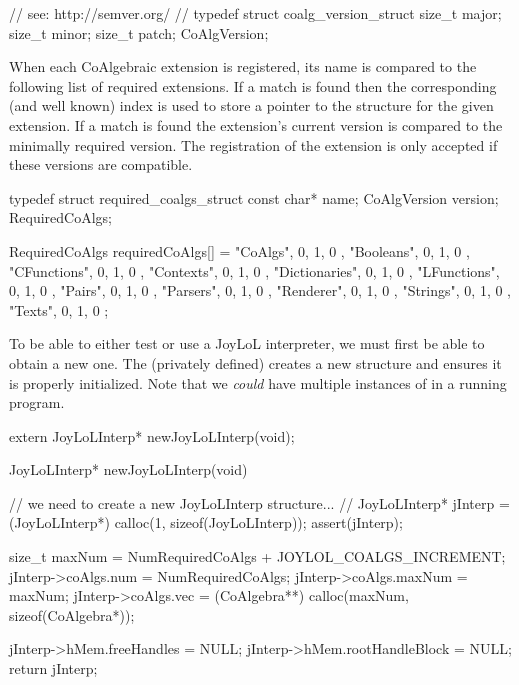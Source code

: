 \startCHeader
// see: http://semver.org/
//
typedef struct coalg_version_struct {
  size_t major;
  size_t minor;
  size_t patch;
} CoAlgVersion;
\stopCHeader

When each CoAlgebraic extension is registered, its name is compared to the 
following list of required extensions. If a match is found then the 
corresponding (and well known) index is used to store a pointer to the 
 structure for the given extension. If a match is found 
the extension's current version is compared to the minimally required 
version. The registration of the extension is only accepted if these 
versions are compatible. 

\startCCode
typedef struct required_coalgs_struct {
  const char*  name;
  CoAlgVersion version;
} RequiredCoAlgs;

RequiredCoAlgs requiredCoAlgs[] = {
  {"CoAlgs",       {0, 1, 0 }},
  {"Booleans",     {0, 1, 0 }},
  {"CFunctions",   {0, 1, 0 }},
  {"Contexts",     {0, 1, 0 }},
  {"Dictionaries", {0, 1, 0 }},
  {"LFunctions",   {0, 1, 0 }},
  {"Pairs",        {0, 1, 0 }},
  {"Parsers",      {0, 1, 0 }},
  {"Renderer",     {0, 1, 0 }},
  {"Strings",      {0, 1, 0 }},
  {"Texts",        {0, 1, 0 }}
};
\stopCCode

\startTestSuite[newJoyLoLInterp]

To be able to either test or use a JoyLoL interpreter, we must first be 
able to obtain a new one. The (privately defined)  
creates a new  structure and ensures it is properly 
initialized. Note that we \emph{could} have multiple instances of 
 in a running program. 

\startCHeader
extern JoyLoLInterp* newJoyLoLInterp(void);
\stopCHeader
{}

\startCCode
JoyLoLInterp* newJoyLoLInterp(void) {
  // we need to create a new JoyLoLInterp structure...
  //
  JoyLoLInterp* jInterp = 
    (JoyLoLInterp*) calloc(1, sizeof(JoyLoLInterp));
  assert(jInterp);
    
  size_t maxNum =
    NumRequiredCoAlgs + JOYLOL_COALGS_INCREMENT;
  jInterp->coAlgs.num    = NumRequiredCoAlgs;
  jInterp->coAlgs.maxNum = maxNum;
  jInterp->coAlgs.vec    =
    (CoAlgebra**) calloc(maxNum, sizeof(CoAlgebra*));
  
  jInterp->hMem.freeHandles     = NULL;
  jInterp->hMem.rootHandleBlock = NULL; 
  return jInterp;
}
\stopCCode


